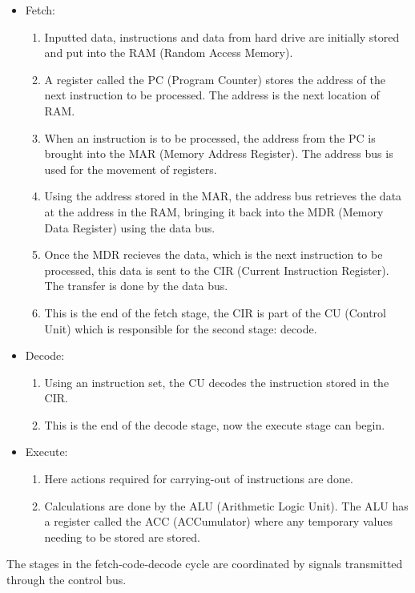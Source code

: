 \documentclass{article}
\begin{document}
\begin{itemize}
	\item Fetch: 
		\begin{enumerate}
			\item Inputted data, instructions and data from hard drive are initially 
				stored and put into the RAM (Random Access Memory).
			\item A register called the PC (Program Counter) stores the address of the next
				instruction to be processed. The address is the next location of RAM.
			\item When an instruction is to be processed, the address from the PC is 
				brought into the MAR (Memory Address Register). The address bus is used for
				the movement of registers.
			\item Using the address stored in the MAR, the address bus retrieves the data
				at the address in the RAM, bringing it back into the MDR (Memory Data
				Register) using the data bus.
			\item Once the MDR recieves the data, which is the next instruction to be
				processed, this data is sent to the CIR (Current Instruction Register). The
				transfer is done by the data bus.
			\item This is the end of the fetch stage, the CIR is part of the CU (Control
				Unit) which is responsible for the second stage: decode.
		\end{enumerate}
	
	\item Decode:
		\begin{enumerate}
			\item Using an instruction set, the CU decodes the instruction stored in the
				CIR.
			\item This is the end of the decode stage, now the execute stage can begin.
		\end{enumerate}

	\item Execute:
		\begin{enumerate}
			\item Here actions required for carrying-out of instructions are done.
			\item Calculations are done by the ALU (Arithmetic Logic Unit). The ALU
				has a register called the ACC (ACCumulator) where any temporary values
				needing to be stored are stored.
		\end{enumerate}
\end{itemize}
The stages in the fetch-code-decode cycle are coordinated by signals transmitted through
the control bus.
\end{document}
